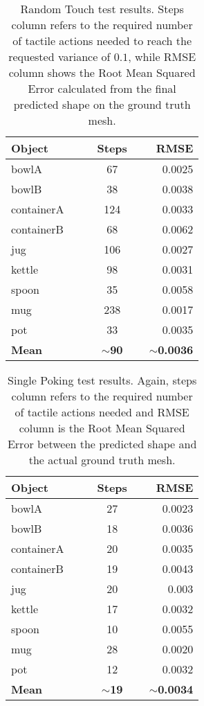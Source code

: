 \begin{table}
    \centering
    \begin{tabularx}{0.95\columnwidth}{lccccr}
        \toprule
        Object & & & Steps && RMSE \\
        \midrule
        bowlA & & &67 && 0.0025\\
        bowlB & & &38 && 0.0038\\
        containerA &&& 124 && 0.0033\\
        containerB &&& 68 && 0.0062\\
        jug &&& 106 && 0.0027\\
        kettle &&& 98 && 0.0031\\
        spoon &&& 35 && 0.0058\\
        mug &&& 238 && 0.0017\\
        pot &&& 33 && 0.0035\\
        \midrule
        \textbf{Mean} &&& $\sim$\textbf{90} && $\sim$\textbf{0.0036}\\
        \bottomrule
    \end{tabularx}
    \caption{Random Touch test results. Steps column refers to the required number of
    tactile actions needed to reach the requested variance of $0.1$, while RMSE column shows
the Root Mean Squared Error calculated from the final predicted shape on the ground truth mesh.}
    \label{tab:test1}
\end{table}
\begin{table}
    \centering
    \begin{tabularx}{0.95\columnwidth}{lccccr}
        \toprule
        Object & & & Steps && RMSE \\
        \midrule
        bowlA & & &27 && 0.0023\\
        bowlB & & &18 && 0.0036\\
        containerA &&& 20 && 0.0035\\
        containerB &&& 19 && 0.0043\\
        jug &&& 20 && 0.003\\
        kettle &&& 17 && 0.0032\\
        spoon &&& 10 && 0.0055\\
        mug &&& 28 && 0.0020\\
        pot &&& 12 && 0.0032\\
        \midrule
        \textbf{Mean} &&& $\sim$\textbf{19} && $\sim$\textbf{0.0034}\\
        \bottomrule
    \end{tabularx}
    \caption{Single Poking test results. Again, steps column refers to the required
    number of tactile actions needed and RMSE column is the Root Mean Squared Error between
    the predicted shape and the actual ground truth mesh.}
    \label{tab:table2}
\end{table}

